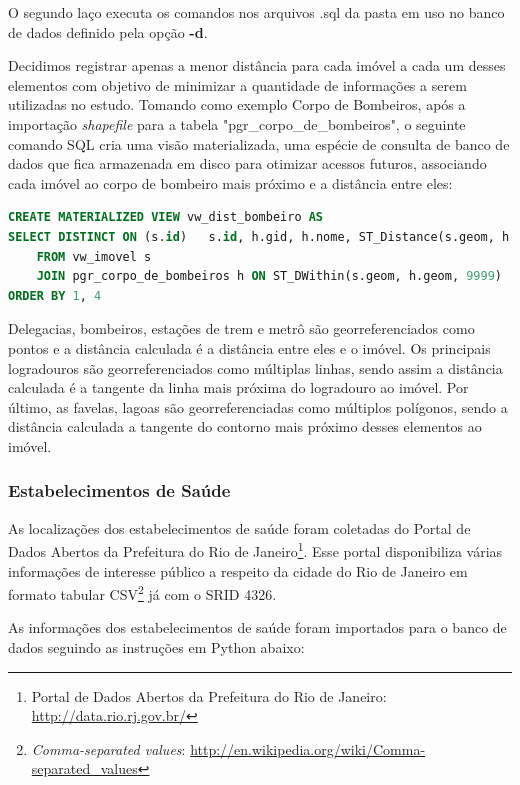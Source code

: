 O segundo laço executa os comandos nos arquivos .sql da pasta em uso no banco de dados definido pela opção \textbf{-d}.

Decidimos registrar apenas a menor distância para cada imóvel a cada um desses elementos com objetivo de minimizar a quantidade de informações a serem utilizadas no estudo. Tomando como exemplo Corpo de Bombeiros, após a importação \textit{shapefile} para a tabela "pgr\_corpo\_de\_bombeiros", o seguinte comando SQL cria uma visão materializada, uma espécie de consulta de banco de dados que fica armazenada em disco para otimizar acessos futuros, associando cada imóvel ao corpo de bombeiro mais próximo e a distância entre eles: 

\begin{lstlisting}[language=SQL, float=htpb, caption=Exemplo de cálculo de menor distância por SQL., label=lst_calc_dist_sql]
CREATE MATERIALIZED VIEW vw_dist_bombeiro AS
SELECT DISTINCT ON (s.id) 	s.id, h.gid, h.nome, ST_Distance(s.geom, h.geom, true)
	FROM vw_imovel s
	JOIN pgr_corpo_de_bombeiros h ON ST_DWithin(s.geom, h.geom, 9999)
ORDER BY 1, 4
\end{lstlisting}

Delegacias, bombeiros, estações de trem e metrô são georreferenciados como pontos e a distância calculada é a distância entre eles e o imóvel. Os principais logradouros são georreferenciados como múltiplas linhas, sendo assim a distância calculada é a tangente da linha mais próxima do logradouro ao imóvel. Por último, as favelas, lagoas são georreferenciadas como múltiplos polígonos, sendo a distância calculada a tangente do contorno mais próximo desses elementos ao imóvel.


\subsubsection{Estabelecimentos de Saúde}

As localizações dos estabelecimentos de saúde foram coletadas do Portal de Dados Abertos da Prefeitura do Rio de Janeiro\footnote{Portal de Dados Abertos da Prefeitura do Rio de Janeiro: \url{http://data.rio.rj.gov.br/}}. Esse portal disponibiliza várias informações de interesse público a respeito da cidade do Rio de Janeiro em formato tabular CSV\footnote{\textit{Comma-separated values}: \url{http://en.wikipedia.org/wiki/Comma-separated_values}} já com o SRID 4326.

As informações dos estabelecimentos de saúde foram importados para o banco de dados seguindo as instruções em Python abaixo:

